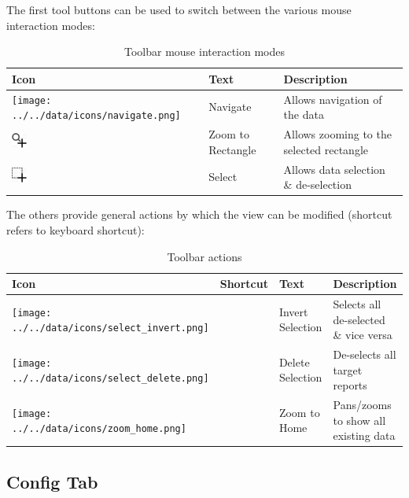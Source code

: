 The first tool buttons can be used to switch between the various mouse interaction modes:

\begin{table}[H]
  \center
  \begin{tabular}{ | l | l | l |}
    \hline
    \textbf{Icon} & \textbf{Text} &  \textbf{Description} \\ \hline
    \texttt{[image: ../../data/icons/navigate.png]} & Navigate & Allows navigation of the data \\ \hline
    \includegraphics[width=0.5cm,frame]{../../data/icons/zoom_select_action.png} & Zoom to Rectangle & Allows zooming to the selected rectangle \\ \hline
    \includegraphics[width=0.5cm,frame]{../../data/icons/select_action.png} & Select & Allows data selection \& de-selection \\ \hline
  \end{tabular}
  \caption{Toolbar mouse interaction modes}
\end{table}

The others provide general actions by which the view can be modified (shortcut refers to keyboard shortcut):


\begin{table}[H]
  \center
  \begin{tabular}{ | l | l | l | l |}
    \hline
    \textbf{Icon} & \textbf{Shortcut} &\textbf{Text} &  \textbf{Description} \\ \hline
    \texttt{[image: ../../data/icons/select\_invert.png]} & & Invert Selection & Selects all de-selected \& vice versa \\ \hline
    \texttt{[image: ../../data/icons/select\_delete.png]} & & Delete Selection & De-selects all target reports \\ \hline
    \texttt{[image: ../../data/icons/zoom\_home.png]} & & Zoom to Home & Pans/zooms to show all existing data \\ \hline
  \end{tabular}
  \caption{Toolbar actions}
\end{table} 

\subsection{Config Tab}

